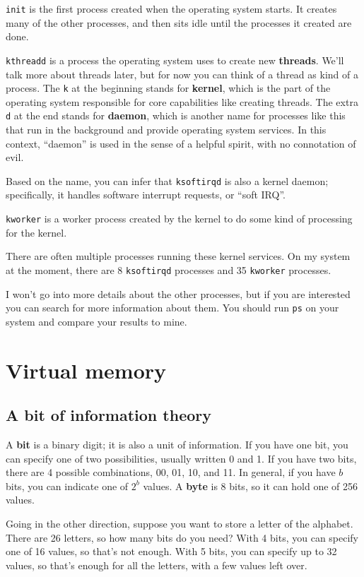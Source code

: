 \documentclass[12pt]{book}
\begin{document}
{{\tt init} is the first process created when the operating system
starts.  It creates many of the other processes, and then sits idle
until the processes it created are done.

{\tt kthreadd} is a process the operating system uses to create new
{\bf threads}.  We'll talk more about threads later, but for now you can
think of a thread as kind of a process.  The {\tt k} at the beginning
stands for {\bf kernel}, which is the part of the operating system
responsible for core capabilities like creating threads.  The extra
{\tt d} at the end stands for {\bf daemon}, which is another name for
processes like this that run in the background and provide operating
system services.  In this context, ``daemon'' is used in the
sense of a helpful spirit, with no connotation of evil.

Based on the name, you can infer that {\tt ksoftirqd} is also a kernel
daemon; specifically, it handles software interrupt requests, or
``soft IRQ''.

{\tt kworker} is a worker process created by the kernel to do some
kind of processing for the kernel.

There are often multiple processes running these kernel services.
On my system at the moment, there are 8 {\tt ksoftirqd} processes
and 35 {\tt kworker} processes.

I won't go into more details about the other processes, but if you
are interested you can search for more information about them.
You should run {\tt ps} on your system and compare your results
to mine.



\chapter{Virtual memory}

\section{A bit of information theory}

A {\bf bit} is a binary digit; it is also a unit of information.  If you
have one bit, you can specify one of two possibilities, usually
written 0 and 1.  If you have two bits, there are 4 possible
combinations, 00, 01, 10, and 11.  In general, if you have $b$ bits, you
can indicate one of $2^b$ values.  A {\bf byte} is 8 bits, so it can
hold one of 256 values.

Going in the other direction, suppose you want to store a letter
of the alphabet.  There are 26 letters, so how many bits do you
need?  With 4 bits, you can specify one of 16 values, so that's
not enough.  With 5 bits, you can specify up to 32 values, so
that's enough for all the letters, with a few values left over.

}
\end{document}
